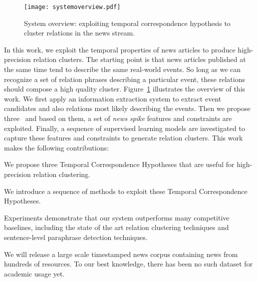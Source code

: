 \begin{figure}
\centering
\texttt{[image: systemoverview.pdf]}
\caption{System overview: exploiting temporal correspondence hypothesis to cluster relations in the news stream.
}
\label{systemoverview}
\end{figure}

In this work, we exploit the temporal properties of news articles to produce high-precision relation clusters. The starting point is that news articles published at the same time tend to describe the same real-world events. So long as we can recognize a set of relation phrases describing a particular event, these relations should compose a high quality cluster. Figure~\ref{systemoverview} illustrates the overview of this work. We first apply an information extraction system to extract event candidates and also relations most likely describing the events. Then we propose three \temporal\ and based on them, a set of {\em news spike} features and constraints are exploited. Finally, a sequence of supervised learning models are investigated to capture these features and constraints to generate relation clusters. This work makes the following contributions:

\bi
    \item We propose three Temporal Correspondence Hypotheses that are useful for high-precision relation clustering.
    \item We introduce a sequence of methods to exploit these Temporal Correspondence Hypotheses.
    \item Experiments demonstrate that our system outperforms many competitive baselines, including the state of the art relation clustering techniques and sentence-level paraphrase detection techniques.
    \item We will release a large scale timestamped news corpus containing news from hundreds of resources. To our best knowledge, there has been no such dataset for academic usage yet.
\ei

